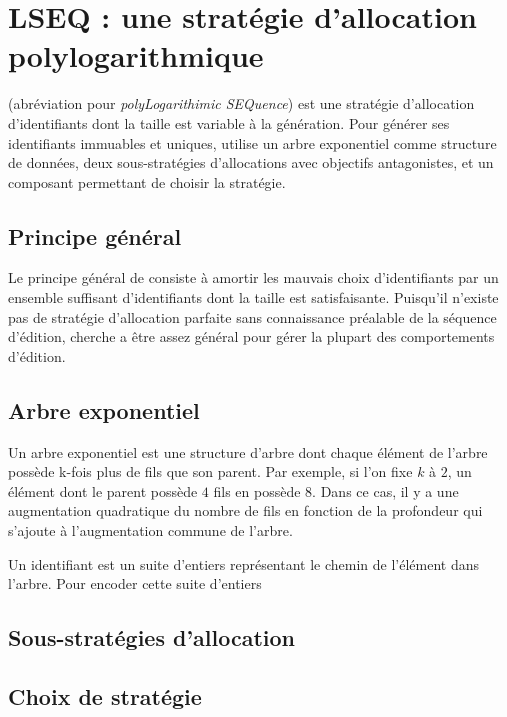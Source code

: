 
\section{LSEQ : une stratégie d'allocation polylogarithmique}

\LSEQ (abréviation pour \emph{polyLogarithimic SEQuence}) est une stratégie
d'allocation d'identifiants dont la taille est variable à la génération. Pour
générer ses identifiants immuables et uniques, \LSEQ utilise un arbre
exponentiel comme structure de données, deux sous-stratégies d'allocations avec
objectifs antagonistes, et un composant permettant de choisir la stratégie.

\subsection{Principe général}

Le principe général de \LSEQ consiste à amortir les mauvais choix d'identifiants
par un ensemble suffisant d'identifiants dont la taille est
satisfaisante. Puisqu'il n'existe pas de stratégie d'allocation parfaite sans
connaissance préalable de la séquence d'édition, \LSEQ cherche a être assez
général pour gérer la plupart des comportements d'édition.


\subsection{Arbre exponentiel}

Un arbre exponentiel est une structure d'arbre dont chaque élément de l'arbre
possède k-fois plus de fils que son parent. Par exemple, si l'on fixe $k$ à $2$,
un élément dont le parent possède $4$ fils en possède $8$. Dans ce cas, il y a
une augmentation quadratique du nombre de fils en fonction de la profondeur qui
s'ajoute à l'augmentation commune de l'arbre.


Un identifiant \LSEQ est un suite d'entiers représentant le chemin de l'élément
dans l'arbre. Pour encoder cette suite d'entiers


\subsection{Sous-stratégies d'allocation}

\subsection{Choix de stratégie}

